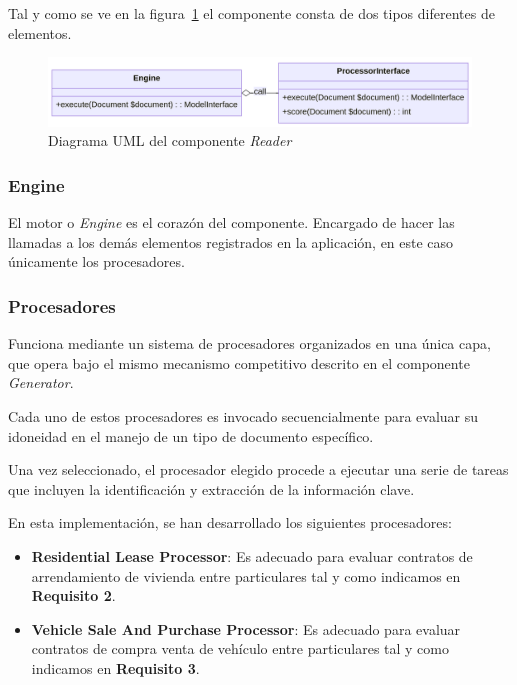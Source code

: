Tal y como se ve en la figura~\ref{fig:chapter_4.reader_component_uml} el componente consta de dos tipos diferentes de
elementos.

\begin{figure}[ht]
    \begin{center}
        \includegraphics[width=\textwidth]{./chapter/4/images/chapter_4.reader_component_uml}
        \caption{Diagrama UML del componente \textit{Reader}}
        \label{fig:chapter_4.reader_component_uml}
    \end{center}
\end{figure}

\subsubsection*{Engine}
El motor o \textit{Engine} es el corazón del componente.
Encargado de hacer las llamadas a los demás elementos registrados en la aplicación, en este caso únicamente los
procesadores.

\subsubsection*{Procesadores}
Funciona mediante un sistema de procesadores organizados en una única capa, que opera bajo el mismo mecanismo
competitivo descrito en el componente \textit{Generator}.

Cada uno de estos procesadores es invocado secuencialmente para evaluar su idoneidad en el manejo de un tipo de documento
específico.

Una vez seleccionado, el procesador elegido procede a ejecutar una serie de tareas que incluyen la identificación y
extracción de la información clave.

En esta implementación, se han desarrollado los siguientes procesadores:

\begin{itemize}
    \item \textbf{Residential Lease Processor}: Es adecuado para evaluar contratos de arrendamiento de vivienda entre
    particulares tal y como indicamos en \textbf{Requisito 2}.
    \item \textbf{Vehicle Sale And Purchase Processor}: Es adecuado para evaluar contratos de compra venta de vehículo
    entre particulares tal y como indicamos en \textbf{Requisito 3}.
\end{itemize}
